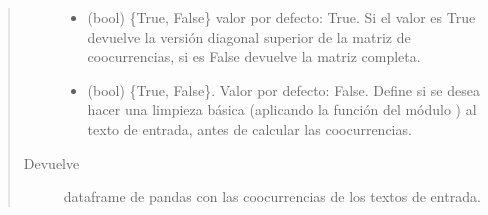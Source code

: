 \documentclass[letterpaper,10pt,openany,spanish]{sphinxmanual}
\begin{document}
\begin{fulllineitems}
\begin{quote}
\begin{description}
\begin{itemize}
\item {} 
 \textendash{} (bool) \{True, False\} valor por defecto: True. Si el valor es True devuelve la versión diagonal superior de la matriz de co\sphinxhyphen{}ocurrencias, si es False devuelve la matriz completa.

\item {} 
 \textendash{} (bool) \{True, False\}. Valor por defecto: False. Define         si se desea hacer una limpieza básica (aplicando la función          del módulo ) al texto de entrada, antes de calcular las co\sphinxhyphen{}ocurrencias.

\end{itemize}

\item[{Devuelve}] \leavevmode
dataframe de pandas con las co\sphinxhyphen{}ocurrencias de los textos de entrada.

\end{description}\end{quote}

\end{fulllineitems}

\end{document}
